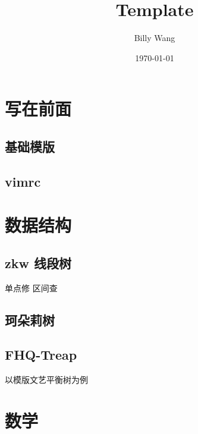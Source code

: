 \documentclass{article}
\title{\textbf{Template}}
\author{Billy Wang}
\date{\today}
\begin{document}
\maketitle
\thispagestyle{fancy}
\tableofcontents
\newpage

\section{写在前面}

\subsection{基础模版}



\subsection{vimrc}



\section{数据结构}

\subsection{zkw 线段树}

单点修 区间查



\subsection{珂朵莉树}



\subsection{FHQ-Treap}

以模版文艺平衡树为例



\section{数学}
\end{document}
